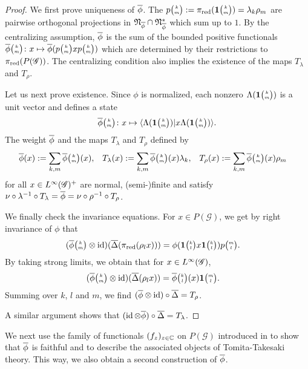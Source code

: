 \begin{proof}
  We first prove uniqueness of $\overline{\phi}$.  The
  $p{\tiny {\begin{pmatrix} k\\m\end{pmatrix}}}:=\pi_{\operatorname{\mathrm{red}}}(\mathbf{1}{\tiny {\begin{pmatrix} k\\m\end{pmatrix}}})=\lambda_{k}\rho_{m}$ are pairwise orthogonal
  projections in $\mathfrak{N}_{\overline{\phi}}\cap \mathfrak{N}_{\overline{\phi}}^*$ which sum up to $1$. By the centralizing assumption, $\overline{\phi}$ is the sum of the bounded positive functionals
  $\overline{\phi}{\tiny {\begin{pmatrix} k\\m\end{pmatrix}}} \colon x \mapsto
  \overline{\phi}(p{\tiny {\begin{pmatrix} k\\m\end{pmatrix}}}xp{\tiny {\begin{pmatrix} k\\m\end{pmatrix}}})$ which are determined
  by their restrictions to $\pi_{\operatorname{\mathrm{red}}}(P(\mathscr{G}))$. The centralizing condition also implies the existence of the maps $T_{\lambda}$ and $T_{\rho}$. 

Let us next prove existence.  Since $\phi$ is normalized,   each nonzero
$\Lambda(\mathbf{1}{\tiny {\begin{pmatrix} k\\m\end{pmatrix}}})$ is a unit vector and defines a state
\begin{align*}
  \overline{\phi}{\tiny {\begin{pmatrix} k\\m\end{pmatrix}}} \colon x \mapsto \langle \Lambda(\mathbf{1}{\tiny {\begin{pmatrix} k\\m\end{pmatrix}}})|x \Lambda(\mathbf{1}{\tiny {\begin{pmatrix} k\\m\end{pmatrix}}})\rangle.
\end{align*}The weight $\overline{\phi}$ and the maps $T_{\lambda}$ and $T_{\rho}$
defined by
\begin{align} \label{eq:vn-weights}
  \overline{\phi}(x) &:= \sum_{k,m} \overline{\phi}{\tiny {\begin{pmatrix} k\\m\end{pmatrix}}}(x), &
    T_{\lambda}(x)&:= \sum_{k,m}
\overline{\phi}{\tiny {\begin{pmatrix} k\\m\end{pmatrix}}}(x)\lambda_{k}, & 
T_{\rho}(x)&:=
    \sum_{k,m} \overline{\phi}{\tiny {\begin{pmatrix} k\\m\end{pmatrix}}}(x)\rho_{m}
\end{align}
for all $x\in L^{\infty}(\mathscr{G})^{+}$  are normal, (semi-)finite and satisfy $\nu
\circ \lambda^{-1} \circ T_{\lambda} = \overline{\phi} = \nu \circ \rho^{-1}
\circ T_{\rho}$.

We finally check the invariance equations. For $x\in P(\mathscr{G})$, we get by right invariance of $\phi$ that   \begin{align*}
    (\overline{\phi}{\tiny {\begin{pmatrix} k\\m\end{pmatrix}}}\otimes \operatorname{id})(\overline{\Delta}(\pi_{\operatorname{\mathrm{red}}}(\rho_lx))) &= 
    \phi(\mathbf{1}{\tiny {\begin{pmatrix} k\\l\end{pmatrix}}}x\mathbf{1}{\tiny {\begin{pmatrix} k\\l\end{pmatrix}}}) p{\tiny {\begin{pmatrix} m\\l\end{pmatrix}}}.
  \end{align*}
By taking strong limits, we obtain that for $x\in L^{\infty}(\mathscr{G})$, 
  \begin{align*}
    (\overline{\phi}{\tiny {\begin{pmatrix} k\\m\end{pmatrix}}}\otimes \operatorname{id})(\overline{\Delta}(\rho_lx)) &= 
    \overline{\phi}{\tiny {\begin{pmatrix} k\\l\end{pmatrix}}}(x) \mathbf{1}{\tiny {\begin{pmatrix} m\\l\end{pmatrix}}}.
  \end{align*} Summing over $k$, $l$ and $m$, we  find $(\overline{\phi}\otimes \operatorname{id})
  \circ \overline{\Delta} = T_{\rho}$. 
  
  A similar argument shows that
  $(\operatorname{id}\otimes \overline{\phi}) \circ \overline{\Delta}=T_{\lambda}$.
\end{proof}

We next use the family of functionals $(f_{z})_{z \in \mathbb{C}}$ on
$P(\mathscr{G})$ introduced in \cite[Theorem 2.25]{DCT1} to show that
$\overline{\phi}$ is faithful and to describe the associated objects of
Tomita-Takesaki theory. This way, we  also obtain a second construction of
$\overline{\phi}$. 


